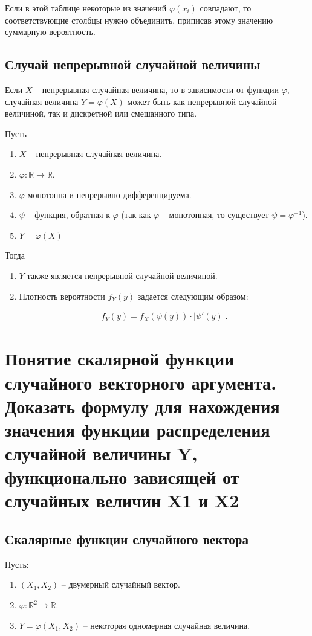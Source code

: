 Если в этой таблице некоторые из значений $\varphi(x_i)$ совпадают, то соответствующие столбцы нужно объединить, приписав этому значению суммарную вероятность.

\subsection*{Случай непрерывной случайной величины}

Если $X$ -- непрерывная случайная величина, то в зависимости от функции $\varphi$, случайная величина $Y = \varphi(X)$ может быть как непрерывной случайной величиной, так и дискретной или смешанного типа.

Пусть
\begin{enumerate}
	\item $X$ -- непрерывная случайная величина.
	\item $\varphi: \mathbb{R} \to \mathbb{R}$.
	\item $\varphi$ монотонна и непрерывно дифференцируема.
	\item $\psi$ -- функция, обратная к $\varphi$ (так как $\varphi$ -- монотонная, то существует $\psi = \varphi^{-1}$).
	\item $Y = \varphi(X)$
\end{enumerate}

Тогда
\begin{enumerate}
	\item $Y$ также является непрерывной случайной величиной.
	\item Плотность вероятности $f_Y(y)$ задается следующим образом: 
	
	\begin{align*}
		f_Y(y) = f_X(\psi(y)) \cdot\left|\psi'(y)\right|.
	\end{align*}
\end{enumerate}

\section{Понятие скалярной функции случайного векторного аргумента. Доказать формулу для нахождения значения функции распределения случайной величины Y, функционально зависящей от случайных величин X1 и X2}

\subsection*{Скалярные функции случайного вектора}

Пусть:
\begin{enumerate}
	
	\item $(X_1,X_2)$ -- двумерный случайный вектор.
	\item $\varphi: \mathbb{R}^2 \to \mathbb{R}$.
	\item $Y = \varphi(X_1, X_2)$ -- некоторая одномерная случайная величина.
\end{enumerate}

